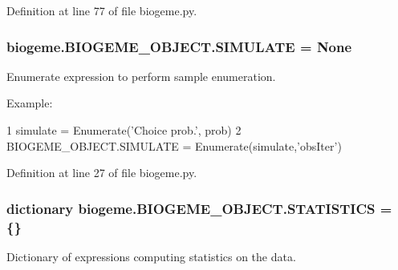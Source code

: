 Definition at line 77 of file biogeme.\+py.

\subsubsection[{\texorpdfstring{S\+I\+M\+U\+L\+A\+TE}{SIMULATE}}]{\setlength{\rightskip}{0pt plus 5cm}biogeme.\+B\+I\+O\+G\+E\+M\+E\+\_\+\+O\+B\+J\+E\+C\+T.\+S\+I\+M\+U\+L\+A\+TE = None\hspace{0.3cm}{\ttfamily [static]}}\hypertarget{classbiogeme_1_1_b_i_o_g_e_m_e___o_b_j_e_c_t_ab1eb6d8235bf68d484b0a81eb7d41003}{}\label{classbiogeme_1_1_b_i_o_g_e_m_e___o_b_j_e_c_t_ab1eb6d8235bf68d484b0a81eb7d41003}


Enumerate expression to perform sample enumeration. 

Example\+: 
\begin{DoxyCode}
1 simulate = Enumerate(\textcolor{stringliteral}{'Choice prob.'}, prob)
2 BIOGEME\_OBJECT.SIMULATE = Enumerate(simulate,\textcolor{stringliteral}{'obsIter'}) 
\end{DoxyCode}
 

Definition at line 27 of file biogeme.\+py.

\subsubsection[{\texorpdfstring{S\+T\+A\+T\+I\+S\+T\+I\+CS}{STATISTICS}}]{\setlength{\rightskip}{0pt plus 5cm}dictionary biogeme.\+B\+I\+O\+G\+E\+M\+E\+\_\+\+O\+B\+J\+E\+C\+T.\+S\+T\+A\+T\+I\+S\+T\+I\+CS = \{\}\hspace{0.3cm}{\ttfamily [static]}}\hypertarget{classbiogeme_1_1_b_i_o_g_e_m_e___o_b_j_e_c_t_a93741a718b3b53d9c9430bba5bab00f0}{}\label{classbiogeme_1_1_b_i_o_g_e_m_e___o_b_j_e_c_t_a93741a718b3b53d9c9430bba5bab00f0}


Dictionary of expressions computing statistics on the data. 

